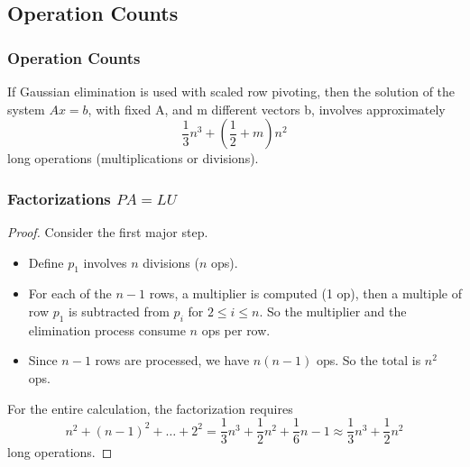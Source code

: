 \documentclass[notheorems,mathserif,table,compress]{beamer}  %
\begin{document}
\subsection{Operation Counts}

\begin{frame}
\frametitle{Operation Counts} 
\begin{theorem}
If Gaussian elimination is used with scaled row pivoting, then the solution of the system $Ax=b$, with fixed A, and m different vectors b, involves approximately
\begin{displaymath}
\frac{1}{3}n^3+(\frac{1}{2}+m)n^2
\end{displaymath}
long operations (multiplications or divisions).
\end{theorem}

\end{frame}

\begin{frame}
\frametitle{Factorizations $PA=LU$} 
\begin{proof}
Consider the first major step. 
\begin{itemize}
\item Define $p_1$ involves $n$ divisions ($n$ ops).
\item For each of the $n-1$ rows, a multiplier is computed (1 op), then a multiple of row $p_1$ is subtracted from $p_i$ for $2\leq i\leq n$. So the multiplier and the elimination process consume $n$ ops per row.
\item Since $n-1$ rows are processed, we have $n(n-1)$ ops. So the total is $n^2$ ops.
\end{itemize}
For the entire calculation, the factorization requires
\begin{displaymath}
n^2+(n-1)^2+\ldots+2^2=\frac{1}{3}n^3+\frac{1}{2}n^2+\frac{1}{6}n-1\approx\frac{1}{3}n^3+\frac{1}{2}n^2
\end{displaymath}
long operations.
\end{proof}

\end{frame}
\end{document}
